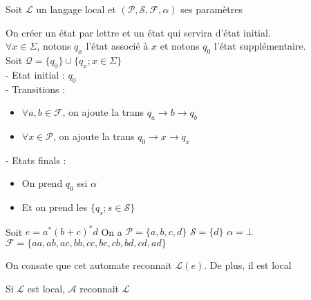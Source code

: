 Soit $\mathcal{L}$ un langage local et $(\mathcal{P},\mathcal{S},\mathcal{F},\alpha)$ ses paramètres

On créer un état par lettre et un état qui servira d'état initial.\\

$\forall x \in \Sigma$, notons $q_x$ l'état associé à $x$ et notons $q_0$ l'état supplémentaire.\\
Soit $\mathcal{Q}=\{q_0\}\cup\{q_x;x\in \Sigma\}$\\

- Etat initial : $q_0$\\

- Transitions : 
\begin{itemize}
    \item $\forall a,b \in \mathcal{F}$, on ajoute la trans $q_a \rightarrow b \rightarrow q_b$
    \item $\forall x \in \mathcal{P}$, on ajoute la trans $q_0 \rightarrow x \rightarrow q_x$
\end{itemize}

- Etats finals :
\begin{itemize}
    \item On prend $q_0$ ssi $\alpha$
    \item Et on prend les $\{q_s ; s\in \mathcal{S} \}$
\end{itemize}

\begin{exemple}
    Soit $e=a^*(b+c)^*d$
    On a    $\mathcal{P} = \{a,b,c,d\}$
            $\mathcal{S} = \{d\}$
            $\alpha=\bot$
            $\mathcal{F} = \{aa,ab,ac,bb,cc,bc,cb,bd,cd,ad\}$

    On consate que cet automate reconnait $\mathcal{L}(e)$. De plus, il est local
\end{exemple}

\begin{theorem}
    Si $\mathcal{L}$ est local, $\mathcal{A}$ reconnait $\mathcal{L}$
\end{theorem}

